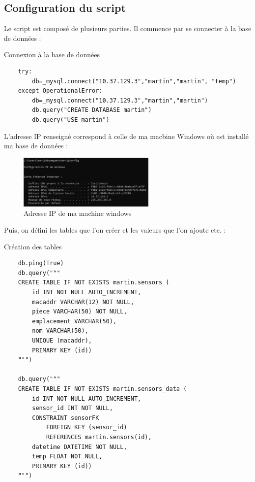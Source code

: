 \documentclass[12pt, a4paper]{article}
\begin{document}
		\subsection{Configuration du script}
		Le script est composé de plusieurs parties. Il commence par se connecter à la base 
		de données :
		\begin{listing}[H]
			\caption{Connexion à la base de données}
			\label{lst:co}
			\begin{verbatim}
	try:
    	db=_mysql.connect("10.37.129.3","martin","martin", "temp")
	except OperationalError:
    	db=_mysql.connect("10.37.129.3","martin","martin")
    	db.query("CREATE DATABASE martin")
    	db.query("USE martin")
			\end{verbatim}
		\end{listing}
		\newpage
		L'adresse IP renseigné correspond à celle de ma macbine Windows où est installé
		ma base de données :
		\begin{figure}[H]
			\centering
			\includegraphics[width=0.6\textwidth]{../img/ip.png}
			\caption{Adresse IP de ma machine windows}
			\label{fig:ip}
		\end{figure}
	
		Puis, on défini les tables que l'on créer et les valeurs que l'on ajoute etc. :
		\begin{listing}[H]
			\caption{Création des tables}
			\label{lst:tables}
			\begin{verbatim}
	db.ping(True)
	db.query("""
	CREATE TABLE IF NOT EXISTS martin.sensors (
		id INT NOT NULL AUTO_INCREMENT,
		macaddr VARCHAR(12) NOT NULL,
		piece VARCHAR(50) NOT NULL,
		emplacement VARCHAR(50),
		nom VARCHAR(50),
		UNIQUE (macaddr),
		PRIMARY KEY (id))
	""")

	db.query("""
	CREATE TABLE IF NOT EXISTS martin.sensors_data (
		id INT NOT NULL AUTO_INCREMENT,
		sensor_id INT NOT NULL,
		CONSTRAINT sensorFK
			FOREIGN KEY (sensor_id)
			REFERENCES martin.sensors(id),
		datetime DATETIME NOT NULL,
		temp FLOAT NOT NULL,
		PRIMARY KEY (id))
	""")
			\end{verbatim}
		\end{listing}
\end{document}
